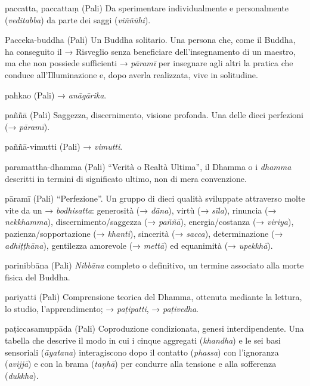 \begin{glossarydescription}
\item[paccatta, paccattaṃ] (Pali) Da sperimentare individualmente e
personalmente (\emph{veditabba}) da parte dei saggi (\emph{viññūhi}).

\item[Pacceka-buddha] (Pali) Un Buddha solitario. Una persona che, come il
Buddha, ha conseguito il → Risveglio senza beneficiare
dell'insegnamento di un maestro, ma che non possiede sufficienti →
\emph{pāramī} per insegnare agli altri la pratica che conduce
all'Illuminazione e, dopo averla realizzata, vive in solitudine.

\item[pahkao] (Pali) → \emph{anāgārika}.

\item[paññā] (Pali) Saggezza, discernimento, visione profonda. Una delle dieci
perfezioni (→ \emph{pāramī}).

\item[paññā-vimutti] (Pali) → \emph{vimutti}.

\item[paramattha-dhamma] (Pali) ``Verità o Realtà Ultima'', il Dhamma o i
\emph{dhamma} descritti in termini di significato ultimo, non di mera
convenzione.

\item[pāramī] (Pali) ``Perfezione''. Un gruppo di dieci qualità sviluppate
attraverso molte vite da un → \emph{bodhisatta}: generosità (→
\emph{dāna}), virtù (→ \emph{sīla}), rinuncia (→ \emph{nekkhamma}),
discernimento/saggezza (→ \emph{paññā}), energia/costanza (→
\emph{viriya}), pazienza/sopportazione (→ \emph{khanti}), sincerità (→
\emph{sacca}), determinazione (→ \emph{adhiṭṭhāna}), gentilezza
amorevole (→ \emph{mettā}) ed equanimità (→ \emph{upekkhā}).

\item[parinibbāna] (Pali) \emph{Nibbāna} completo o definitivo, un termine
associato alla morte fisica del Buddha.

\item[pariyatti] (Pali) Comprensione teorica del Dhamma, ottenuta mediante la
lettura, lo studio, l'apprendimento; → \emph{paṭipatti}, →
\emph{paṭivedha}.

\item[paṭiccasamuppāda] (Pali) Coproduzione condizionata, genesi
interdipendente. Una tabella che descrive il modo in cui i cinque
aggregati (\emph{khandha}) e le sei basi sensoriali (\emph{āyatana})
interagiscono dopo il contatto (\emph{phassa}) con l'ignoranza
(\emph{avijjā}) e con la brama (\emph{taṇhā}) per condurre alla tensione
e alla sofferenza (\emph{dukkha}).


\end{glossarydescription}

